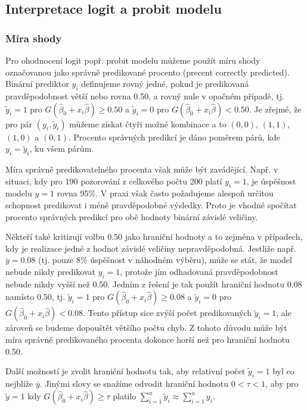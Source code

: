 \subsection{Interpretace logit a probit modelu}

\subsubsection{Míra shody}

Pro ohodnocení logit popř. probit modelu můžeme použít míru shody označovanou jako správně predikované procento (precent correctly predicted). Binární prediktor $y_i$ definujeme rovný jedné, pokud je predikovaná pravděpodobnost větší nebo rovna 0.50, a rovný nule v opačném případě, tj. $\tilde{y}_i = 1$ pro $G(\hat{\beta}_0 + x_i \hat{\beta}) \ge 0.50$ a $\tilde{y}_i = 0$ pro $G(\hat{\beta}_0 + x_i \hat{\beta}) < 0.50$. Je zřejmé, že pro pár $(y_i, \tilde{y}_i)$ můžeme získat čtyři možné kombinace a to $(0, 0)$, $(1, 1)$, $(1, 0)$ a $(0, 1)$. Procento správných predikcí je dáno poměrem párů, kde $y_i = \tilde{y}_i$, ku všem párům.

Míra správně predikovatelného procenta však může být zavádějící. Např. v situaci, kdy pro 190 pozorování z celkového počtu 200 platí $y_i = 1$, je úspěšnost modelu $y = 1$ rovna 95\%. V praxi však často požadujeme alespoň určitou schopnost predikovat i méně pravděpodobné výsledky. Proto je vhodné spočítat procento správných predikcí pro obě hodnoty binární závislé veličiny.

Někteří také kritizují volbu 0.50 jako hraniční hodnoty a to zejména v případech, kdy je realizace jedné z hodnot závislé veličiny nepravděpodobná. Jestliže např. $\overline{y} = 0.08$ (tj. pouze 8\% úspěšnost v náhodném výběru), může se stát, že model nebude nikdy predikovat $y_i = 1$, protože jím odhadovaná pravděpodobnost nebude nikdy vyšší než 0.50. Jedním z řešení je tak použít hraniční hodnotu 0.08 namísto 0.50, tj. $\tilde{y}_i = 1$ pro $G(\hat{\beta}_0 + x_i \hat{\beta}) \ge 0.08$ a $\tilde{y}_i = 0$ pro $G(\hat{\beta}_0 + x_i \hat{\beta}) < 0.08$. Tento přístup sice zvýší počet predikovaných $\tilde{y}_i = 1$, ale zároveň se budeme dopouštět většího počtu chyb. Z tohoto důvodu může být míra správně predikovaného procenta dokonce horší než pro hraniční hodnotu 0.50.

Další možností je zvolit hraniční hodnotu tak, aby relativní počet $\tilde{y}_i = 1$ byl co nejblíže $\overline{y}$. Jinými slovy se snažíme odvodit hraniční hodnotu $0 < \tau < 1$, aby pro $\tilde{y} = 1$ kdy $G(\hat{\beta}_0 + x_i \hat{\beta}) \ge \tau$ platilo $\sum_{i = 1}^n \tilde{y}_i \approx \sum_{i = 1}^n y_i$.

